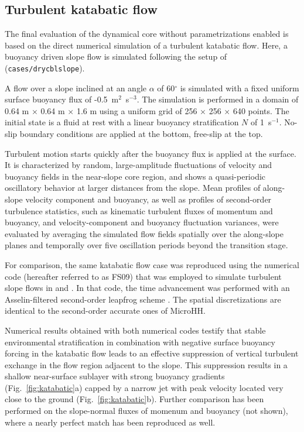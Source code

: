 \documentclass[gmd,manuscript]{copernicus}
\begin{document}
\subsection{Turbulent katabatic flow}
The final evaluation of the dynamical core without parametrizations enabled is based on the direct numerical simulation of a turbulent katabatic flow. Here, a buoyancy driven slope flow is simulated following the setup of \citet{Fedorovich2009} (\texttt{cases/drycblslope}).

A flow over a slope inclined at an angle $\alpha$ of 60$^\circ$ is simulated with a fixed uniform surface buoyancy flux of -0.5~m$^2$~s$^{-3}$. The simulation is performed in a domain of 0.64 m $\times$ 0.64 m $\times$ 1.6 m using a uniform grid of 256 $\times$ 256 $\times$ 640 points. The initial state is a fluid at rest with a linear buoyancy stratification $N$ of 1~s$^{-1}$. No-slip boundary conditions are applied at the bottom, free-slip at the top.

Turbulent motion starts quickly after the buoyancy flux is applied at the surface. It is characterized by random, large-amplitude fluctuations of velocity and buoyancy fields in the near-slope core region, and shows a quasi-periodic oscillatory behavior at larger distances from the slope. Mean profiles of along-slope velocity component and buoyancy, as well as profiles of second-order turbulence statistics, such as kinematic turbulent fluxes of momentum and buoyancy, and velocity-component and buoyancy fluctuation variances, were evaluated by averaging the simulated flow fields spatially over the along-slope planes and temporally over five oscillation periods beyond the transition stage.

For comparison, the same katabatic flow case was reproduced using the numerical code (hereafter referred to as FS09) that was employed to simulate turbulent slope flows in \citet{Shapiro2008} and \citet{Fedorovich2009}. In that code, the time advancement was performed with an Asselin-filtered second-order leapfrog scheme \citep{Durran2013}. The spatial discretizations are identical to the second-order accurate ones of MicroHH. 

Numerical results obtained with both numerical codes testify that stable environmental stratification in combination with negative surface buoyancy forcing in the katabatic flow leads to an effective suppression of vertical turbulent exchange in the flow region adjacent to the slope. This suppression results in a shallow near-surface sublayer with strong buoyancy gradients (Fig.~\ref{fig:katabatic}a) capped by a narrow jet with peak velocity located very close to the ground (Fig.~\ref{fig:katabatic}b). Further comparison has been performed on the slope-normal fluxes of momenum and buoyancy (not shown), where a nearly perfect match has been reproduced as well.
\end{document}
